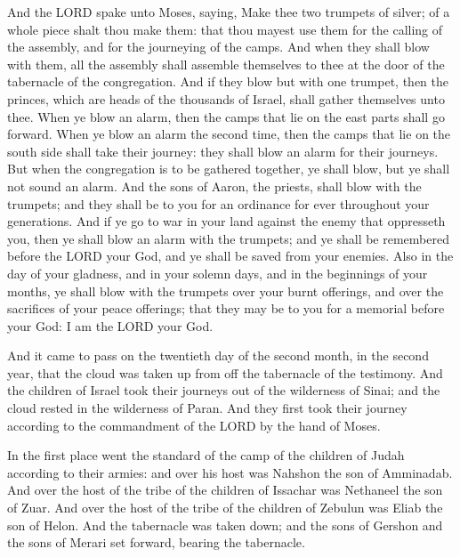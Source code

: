  And the LORD spake unto Moses, saying,  Make
thee two trumpets of silver; of a whole piece shalt thou make them: that
thou mayest use them for the calling of the assembly, and for the
journeying of the camps.  And when they shall blow with
them, all the assembly shall assemble themselves to thee at the door of
the tabernacle of the congregation.  And if they blow but
with one trumpet, then the princes, which are heads of the thousands of
Israel, shall gather themselves unto thee.  When ye blow an
alarm, then the camps that lie on the east parts shall go forward.
 When ye blow an alarm the second time, then the camps that
lie on the south side shall take their journey: they shall blow an alarm
for their journeys.  But when the congregation is to be
gathered together, ye shall blow, but ye shall not sound an alarm.
 And the sons of Aaron, the priests, shall blow with the
trumpets; and they shall be to you for an ordinance for ever throughout
your generations.  And if ye go to war in your land against
the enemy that oppresseth you, then ye shall blow an alarm with the
trumpets; and ye shall be remembered before the LORD your God, and ye
shall be saved from your enemies.  Also in the day of your
gladness, and in your solemn days, and in the beginnings of your months,
ye shall blow with the trumpets over your burnt offerings, and over the
sacrifices of your peace offerings; that they may be to you for a
memorial before your God: I am the LORD your God.

 And it came to pass on the twentieth day of the second
month, in the second year, that the cloud was taken up from off the
tabernacle of the testimony.  And the children of Israel
took their journeys out of the wilderness of Sinai; and the cloud rested
in the wilderness of Paran.  And they first took their
journey according to the commandment of the LORD by the hand of Moses.

 In the first place went the standard of the camp of the
children of Judah according to their armies: and over his host was
Nahshon the son of Amminadab.  And over the host of the
tribe of the children of Issachar was Nethaneel the son of Zuar.
 And over the host of the tribe of the children of Zebulun
was Eliab the son of Helon.  And the tabernacle was taken
down; and the sons of Gershon and the sons of Merari set forward,
bearing the tabernacle.

